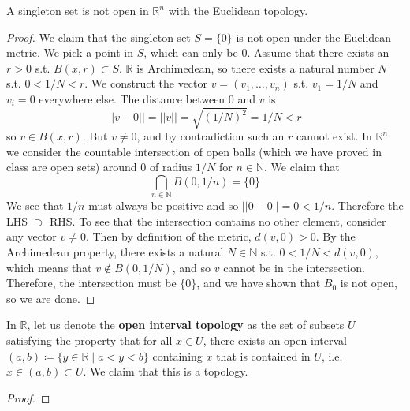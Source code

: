 \documentclass{article}
\begin{document}
    \begin{corollary}
      A singleton set is not open in $\mathbb{R}^n$ with the Euclidean topology.   
    \end{corollary}
    \begin{proof}
      We claim that the singleton set $S = \{0\}$ is not open under the Euclidean metric. We pick a point in $S$, which can only be $0$. Assume that there exists an $r > 0$ s.t. $B(x, r) \subset S$. $\mathbb{R}$ is Archimedean, so there exists a natural number $N$ s.t. $0 < 1/N < r$. We construct the vector $v = (v_1, \ldots, v_n)$ s.t. $v_1 = 1/N$ and $v_i = 0$ everywhere else. The distance between $0$ and $v$ is 
      \begin{equation}
        || v - 0 || = ||v|| = \sqrt{(1/N)^2} = 1/N < r
      \end{equation} 
      so $v \in B(x, r)$. But $v \neq 0$, and by contradiction such an $r$ cannot exist. In $\mathbb{R}^n$ we consider the countable intersection of open balls (which we have proved in class are open sets) around $0$ of radius $1/N$ for $n \in \mathbb{N}$. We claim that 
      \begin{equation}
        \bigcap_{n \in \mathbb{N}} B(0, 1/n) = \{0\}
      \end{equation} 
      We see that $1/n$ must always be positive and so $||0 - 0|| = 0 < 1/n$. Therefore the LHS $\supset $ RHS. To see that the intersection contains no other element, consider any vector $v \neq 0$. Then by definition of the metric, $d(v, 0) > 0$. By the Archimedean property, there exists a natural $N \in \mathbb{N}$ s.t. $0 < 1/N < d(v, 0)$, which means that $v \not\in B(0, 1/N)$, and so $v$ cannot be in the intersection. Therefore, the intersection must be $\{0\}$, and we have shown that $B_0$ is not open, so we are done. 
    \end{proof}

    \begin{theorem}
      In $\mathbb{R}$, let us denote the \textbf{open interval topology} as the set of subsets $U$ satisfying the property that for all $x \in U$, there exists an open interval $(a, b) \coloneqq \{y \in \mathbb{R} \mid a < y < b\}$ containing $x$ that is contained in $U$, i.e. $x \in (a, b) \subset U$. We claim that this is a topology. 
    \end{theorem}
    \begin{proof}
      
    \end{proof}
\end{document}
